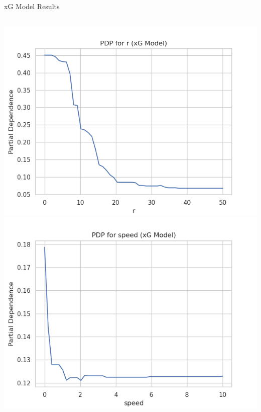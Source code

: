 \documentclass{beamer}
\begin{document}
\begin{frame}{xG Model Results}
\begin{columns}[c]
  \includegraphics[width=\linewidth]{figures/xG_PDP_r.png}
  \includegraphics[width=\linewidth]{figures/xG_PDP_speed.png}


\end{columns}
\end{frame}
\end{document}
